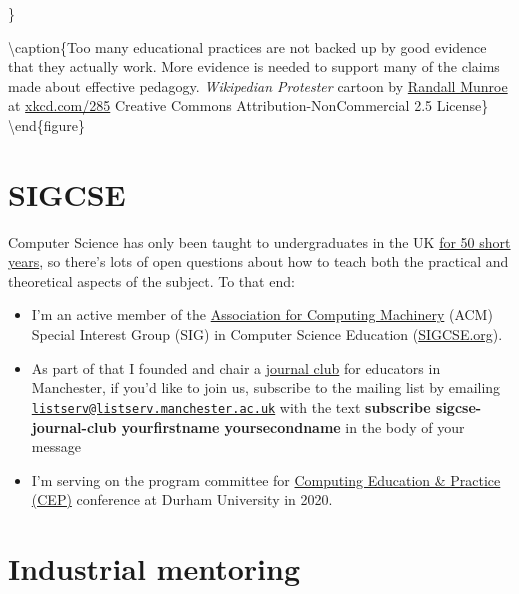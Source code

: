 \documentclass[12pt,]{book}
\providecommand{\tightlist}{%
  \setlength{\itemsep}{0pt}\setlength{\parskip}{0pt}}
\begin{document}
\}

\textbackslash{}caption\{Too many educational practices are not backed up by good evidence that they actually work. More evidence is needed to support many of the claims made about effective pedagogy. \emph{Wikipedian Protester} cartoon by \href{https://en.wikipedia.org/wiki/Randall_Munroe}{Randall Munroe} at \href{https://xkcd.com/285/}{xkcd.com/285} Creative Commons Attribution-NonCommercial 2.5 License\}\label{fig:unnamed-chunk-6}
\textbackslash{}end\{figure\}

\hypertarget{sigcse}{%
\section{SIGCSE}\label{sigcse}}

Computer Science has only been taught to undergraduates in the UK \href{http://www.bbc.co.uk/manchester/content/articles/2005/11/07/baby_computer_40_interview_feature.shtml}{for 50 short years}, so there's lots of open questions about how to teach both the practical and theoretical aspects of the subject. To that end:

\begin{itemize}
\tightlist
\item
  I'm an active member of the \href{https://en.wikipedia.org/wiki/Association_for_Computing_Machinery}{Association for Computing Machinery} (ACM) Special Interest Group (SIG) in Computer Science Education (\href{https://sigcse.org}{SIGCSE.org}).
\item
  As part of that I founded and chair a \href{https://duncan.hull.name/2019/07/17/sigcse-journal-club/}{journal club} for educators in Manchester, if you'd like to join us, subscribe to the mailing list by emailing \href{mailto:listserv@listserv.manchester.ac.uk}{\nolinkurl{listserv@listserv.manchester.ac.uk}} with the text \textbf{subscribe sigcse-journal-club yourfirstname yoursecondname} in the body of your message
\item
  I'm serving on the program committee for \href{http://community.dur.ac.uk/cep.conference}{Computing Education \& Practice (CEP)} conference at Durham University in 2020.
\end{itemize}

\hypertarget{industrial-mentoring-1}{%
\section{Industrial mentoring}\label{industrial-mentoring-1}}
\end{document}
